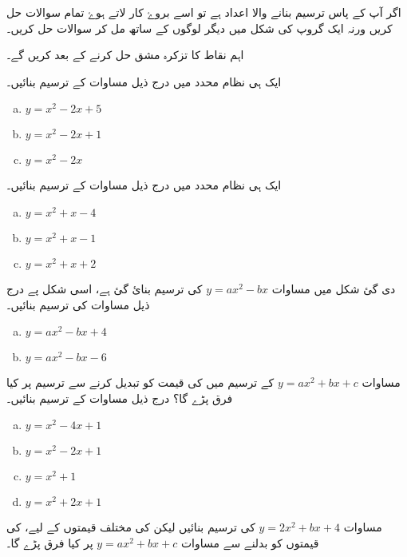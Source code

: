 اگر آپ کے پاس ترسیم بنانے والا اعداد ہے تو اسے بروۓ کار لاتے ہوۓ تمام سوالات حل کریں ورنہ ایک گروپ کی شکل میں دیگر لوگوں کے ساتھ مل کر سوالات حل کریں۔

اہم نقاط  کا تزکرہ مشق حل کرنے کے بعد کریں گے۔

ایک ہی نظام محدد میں درج ذیل مساوات کے ترسیم بنائیں۔
\begin{multicols}{3}
\begin{enumerate}[a.]
\item \( y=x^{2}-2x+5 \)
\item \( y=x^{2}-2x+1 \)
\item \( y=x^{2}-2x \)
 \end{enumerate}
\end{multicols}
ایک ہی نظام محدد میں درج ذیل مساوات کے ترسیم بنائیں۔
\begin{multicols}{3}
\begin{enumerate}[a.]
\item \(y=x^{2}+x-4 \)
\item \( y=x^{2}+x-1 \)
\item \( y=x^{2}+x+2 \)
 \end{enumerate}
\end{multicols}
دی گئ شکل میں مساوات \(y=ax^{2}-bx\) کی ترسیم بنائ گئ ہے، اسی شکل پے درج ذیل مساوات کی ترسیم بنائیں۔
\begin{multicols}{3}
\begin{enumerate}[a.]
\item \( y=ax^{2}-bx+4 \)
\item \( y=ax^{2}-bx-6 \)
 \end{enumerate}
\end{multicols}
مساوات \(y=ax^{2}+bx+c\) کے ترسیم میں  کی قیمت کو تبدیل کرنے سے ترسیم پر کیا فرق پڑے گا؟
درج ذیل مساوات کے ترسیم بنائیں۔
\begin{multicols}{3}
\begin{enumerate}[a.]
\item \( y=x^{2}-4x+1\)
\item \(y=x^{2}-2x+1  \)
\item \( y=x^{2}+1 \)
\item \( y=x^{2}+2x+1 \)
\end{enumerate}
\end{multicols}
مساوات \(y=2x^{2}+bx+4\) کی ترسیم بنائیں لیکن   کی مختلف قیمتوں کے لیے،  کی قیمتوں کو بدلنے سے مساوات \(y=ax^{2}+bx+c\) پر کیا فرق پڑے گا۔
